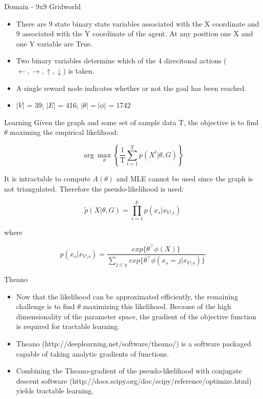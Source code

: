 \documentclass{beamer}
\begin{document}
\begin{frame}{Domain - 9x9 Gridworld}

\begin{itemize}
\item There are 9 state binary state variables associated with the X coordinate and 9 associated with the Y coordinate of the agent. At any position one X and one Y variable are True.
\item Two binary variables determine which of the 4 direcitonal actions ($\leftarrow,\rightarrow,\uparrow,\downarrow$) is taken.
\item A single reward node indicates whether or not the goal has been reached.
\item $|V|$ = 39; $|E|$ = 416; $|\theta| = |\phi|$ = 1742
\end{itemize}
\end{frame}

\begin{frame}{Learning}
Given the graph and some set of sample data $\textrm{T}$, the objective is to find $\theta$ maximing the empirical likelihood:

\[
\arg\max_\theta \left\{
  \frac{1}{\textrm{T}}\sum_{t=1}^{\textrm{T}}p(X^t|\theta,G)
\right\}
\]

It is intractable to compute $A(\theta)$ and MLE cannot be used since the graph is not triangulated. Therefore the pseudo-likelihood is used:

\[
  \tilde{p}(X|\theta,G) = \prod_{s=1}^p p(x_s | x_{V\setminus s})
\]

where

\[
p(x_s | x_{V\setminus s})
=
\frac{exp\{\theta^\intercal\phi(X)\}}{\sum_{j \in \chi} exp\{\theta^\intercal\phi(x_s = j | x_{V\setminus s})\}}
\]
\end{frame}


\begin{frame}{Theano}
\begin{itemize}
\item Now that the likelihood can be approximated efficiently, the remaining challenge is to find $\theta$ maximizing this likelihood. Because of the high dimensionality of the parameter space, the gradient of the objective function is required for tractable learning.
\item Theano (http://deeplearning.net/software/theano/) is a software packaged capable of taking analytic gradients of functions.
\item Combining the Theano-gradient of the pseudo-likelihood with conjugate descent software (http://docs.scipy.org/doc/scipy/reference/optimize.html) yields tractable learning.
\end{itemize}
\end{frame}
\end{document}
